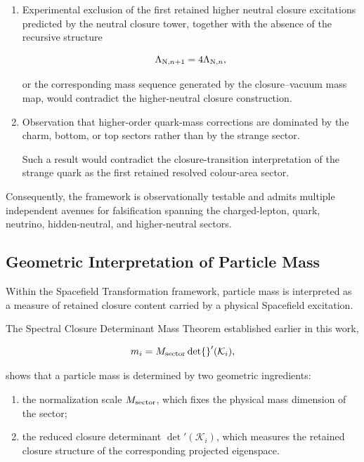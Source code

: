 \documentclass[11pt]{article}
\theoremstyle{definition}
\theoremstyle{remark}
\begin{document}
\begin{enumerate}
in experimental regimes possessing sufficient sensitivity to
the couplings implied by the closure framework would place
strong constraints on the retained hidden-sector
interpretation.

\item Experimental exclusion of the first retained higher
neutral closure excitations predicted by the neutral closure
tower, together with the absence of the recursive structure

\[
\Lambda_{{\rm N},n+1}
=
4\Lambda_{{\rm N},n},
\]

or the corresponding mass sequence generated by the
closure--vacuum mass map, would contradict the higher-neutral
closure construction.

\item Observation that higher-order quark-mass corrections are
dominated by the charm, bottom, or top sectors rather than by
the strange sector.

Such a result would contradict the closure-transition
interpretation of the strange quark as the first retained
resolved colour-area sector.

\end{enumerate}

Consequently, the framework is observationally testable and
admits multiple independent avenues for falsification spanning
the charged-lepton, quark, neutrino, hidden-neutral, and
higher-neutral sectors.



\subsection{Geometric Interpretation of Particle Mass}
\label{subsec:geometric_interpretation_mass}

Within the Spacefield Transformation framework, particle mass is
interpreted as a measure of retained closure content carried by
a physical Spacefield excitation.

The Spectral Closure Determinant Mass Theorem established
earlier in this work,

\begin{equation}
m_i
=
M_{\rm sector}
\det{}'(\mathcal K_i),
\end{equation}

shows that a particle mass is determined by two geometric
ingredients:

\begin{enumerate}

\item the normalization scale \(M_{\rm sector}\), which fixes
the physical mass dimension of the sector;

\item the reduced closure determinant
\(\det{}'(\mathcal K_i)\), which measures the retained closure
structure of the corresponding projected eigenspace.

\end{enumerate}
\end{document}
